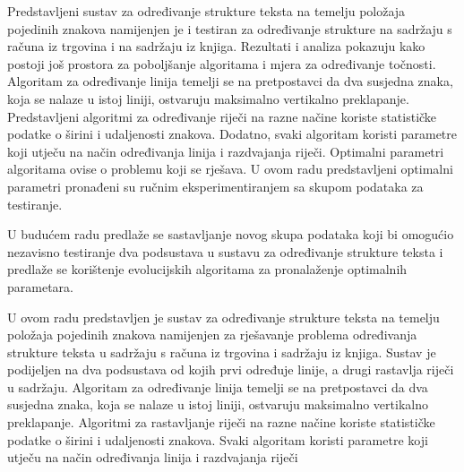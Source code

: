 \documentclass[times, utf8, zavrsni]{fer}
\begin{document}
Predstavljeni sustav za određivanje strukture teksta na temelju položaja
pojedinih znakova namijenjen je i testiran za određivanje strukture na sadržaju s
računa iz trgovina i na sadržaju iz knjiga. Rezultati i analiza pokazuju kako
postoji još prostora za poboljšanje algoritama i mjera za određivanje
točnosti. Algoritam za određivanje linija temelji se na pretpostavci da dva
susjedna znaka, koja se nalaze u istoj liniji, ostvaruju maksimalno vertikalno
preklapanje. Predstavljeni algoritmi za određivanje riječi na razne načine
koriste statističke podatke o širini i udaljenosti znakova. Dodatno,
svaki algoritam koristi parametre koji utječu na način određivanja linija i
razdvajanja riječi. Optimalni parametri algoritama ovise o problemu koji se
rješava. U ovom radu predstavljeni optimalni parametri pronađeni su ručnim
eksperimentiranjem sa skupom podataka za testiranje.

U budućem radu predlaže se sastavljanje novog skupa podataka koji bi omogućio
nezavisno testiranje dva podsustava u sustavu za određivanje strukture teksta i
predlaže se korištenje evolucijskih algoritama za pronalaženje optimalnih
parametara.




\begin{sazetak}
U ovom radu predstavljen je sustav za određivanje strukture teksta na temelju
položaja pojedinih znakova namijenjen za rješavanje problema određivanja
strukture teksta u sadržaju s računa iz trgovina i sadržaju iz knjiga. Sustav je
podijeljen na dva podsustava od kojih prvi određuje linije, a drugi rastavlja
riječi u sadržaju. Algoritam za određivanje linija temelji se na pretpostavci
da dva susjedna znaka, koja se nalaze u istoj liniji, ostvaruju maksimalno
vertikalno preklapanje. Algoritmi za rastavljanje riječi na razne načine
koriste statističke podatke o širini i udaljenosti znakova. Svaki algoritam
koristi parametre koji utječu na način određivanja linija i razdvajanja riječi


\end{sazetak}
\end{document}
